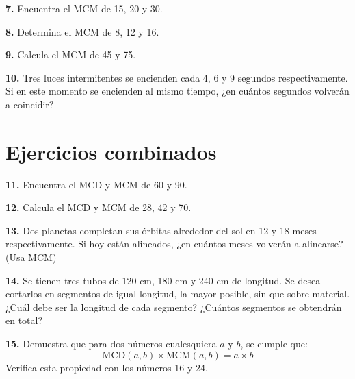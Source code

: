 \documentclass[12pt,a4paper]{article}
\begin{document}
\vspace{2cm}

\textbf{7.} Encuentra el MCM de 15, 20 y 30.

\vspace{2cm}

\textbf{8.} Determina el MCM de 8, 12 y 16.

\vspace{2cm}

\textbf{9.} Calcula el MCM de 45 y 75.

\vspace{2cm}

\textbf{10.} Tres luces intermitentes se encienden cada 4, 6 y 9 segundos respectivamente. Si en este momento se encienden al mismo tiempo, ¿en cuántos segundos volverán a coincidir?

\vspace{3cm}

\section{Ejercicios combinados}

\textbf{11.} Encuentra el MCD y MCM de 60 y 90.

\vspace{2cm}

\textbf{12.} Calcula el MCD y MCM de 28, 42 y 70.

\vspace{2cm}

\textbf{13.} Dos planetas completan sus órbitas alrededor del sol en 12 y 18 meses respectivamente. Si hoy están alineados, ¿en cuántos meses volverán a alinearse? (Usa MCM)

\vspace{3cm}

\textbf{14.} Se tienen tres tubos de 120 cm, 180 cm y 240 cm de longitud. Se desea cortarlos en segmentos de igual longitud, la mayor posible, sin que sobre material. ¿Cuál debe ser la longitud de cada segmento? ¿Cuántos segmentos se obtendrán en total?

\vspace{3cm}

\textbf{15.} Demuestra que para dos números cualesquiera $a$ y $b$, se cumple que: 
$$\text{MCD}(a,b) \times \text{MCM}(a,b) = a \times b$$
Verifica esta propiedad con los números 16 y 24.

\vspace{3cm}
\end{document}
